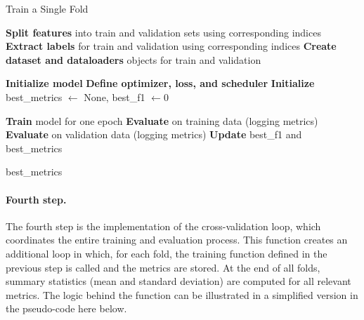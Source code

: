 \documentclass[a4paper,twoside,12pt]{book}
\begin{document}
\begin{algorithm}[H]
	\caption{Train a Single Fold}
	\begin{algorithmic}
		\Statex \vspace{0.5em}
		\State \textbf{Split features} into train and validation sets using corresponding indices
		\State \textbf{Extract labels} for train and validation using corresponding indices
		\State \textbf{Create dataset and dataloaders} objects for train and validation
		
		\Statex \vspace{0.5em}
		\State \textbf{Initialize model}
		\State \textbf{Define optimizer, loss, and scheduler}
		\State \textbf{Initialize} best\_metrics $\gets$ None, best\_f1 $\gets 0$

		\Statex \vspace{0.5em}
		\State \textbf{Train} model for one epoch
		\State \textbf{Evaluate} on training data (logging metrics)
		\State \textbf{Evaluate} on validation data (logging metrics)
		\State \textbf{Update} best\_f1 and best\_metrics
		\EndIf
		\EndFor
	
		\State \Return best\_metrics
		
		\EndFunction
	\end{algorithmic}
\end{algorithm}


\paragraph{Fourth step.} The fourth step is the implementation of the cross-validation loop, which coordinates the entire training and evaluation process. This function creates an additional loop in which, for each fold, the training function defined in the previous step is called and the metrics are stored. At the end of all folds, summary statistics (mean and standard deviation) are computed for all relevant metrics.  The logic behind the function can be illustrated in a simplified version in the pseudo-code here below.

\clearpage
\end{document}
